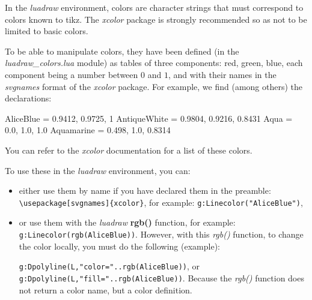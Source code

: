 In the \emph{luadraw} environment, colors are character strings that must correspond to colors known to tikz. The \emph{xcolor} package is strongly recommended so as not to be limited to basic colors.

To be able to manipulate colors, they have been defined (in the \emph{luadraw\_colors.lua} module) as tables of three components: red, green, blue, each component being a number between $0$ and $1$, and with their names in the \emph{svgnames} format of the \emph{xcolor} package. For example, we find (among others) the declarations:

\begin{Luacode}
AliceBlue = {0.9412, 0.9725, 1}
AntiqueWhite = {0.9804, 0.9216, 0.8431}
Aqua = {0.0, 1.0, 1.0}
Aquamarine = {0.498, 1.0, 0.8314}
\end{Luacode}
You can refer to the \emph{xcolor} documentation for a list of these colors.

To use these in the \emph{luadraw} environment, you can:
\begin{itemize}
    \item either use them by name if you have declared them in the preamble: \verb|\usepackage[svgnames]{xcolor}|, for example: \texttt{g:Linecolor("AliceBlue")},

    \item or use them with the \emph{luadraw} \textbf{rgb()} function, for example: \texttt{g:Linecolor(rgb(AliceBlue))}. However, with this \emph{rgb()} function, to change the color locally, you must do the following (example): \par
\texttt{g:Dpolyline(L,"color="..rgb(AliceBlue))}, or \texttt{g:Dpolyline(L,"fill="..rgb(AliceBlue))}. Because the \emph{rgb()} function does not return a color name, but a color definition.
\end{itemize}

